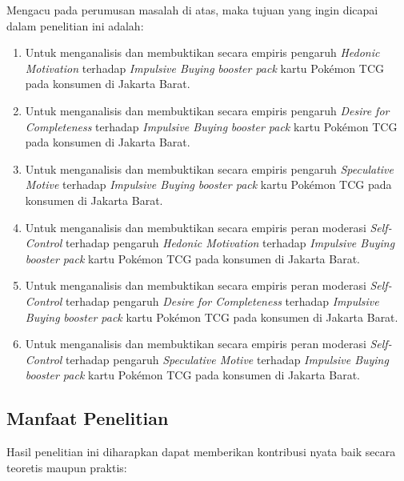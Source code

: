 \documentclass[12pt,a4paper]{article}
\numberwithin{equation}{section}
\numberwithin{table}{section}
\numberwithin{figure}{section}
\begin{document}
Mengacu pada perumusan masalah di atas, maka tujuan yang ingin dicapai dalam penelitian ini adalah:
\begin{enumerate}
  \item Untuk menganalisis dan membuktikan secara empiris pengaruh \emph{Hedonic Motivation} terhadap \emph{Impulsive Buying} \emph{booster pack} kartu Pok\'emon TCG pada konsumen di Jakarta Barat.
  \item Untuk menganalisis dan membuktikan secara empiris pengaruh \emph{Desire for Completeness} terhadap \emph{Impulsive Buying} \emph{booster pack} kartu Pok\'emon TCG pada konsumen di Jakarta Barat.
  \item Untuk menganalisis dan membuktikan secara empiris pengaruh \emph{Speculative Motive} terhadap \emph{Impulsive Buying} \emph{booster pack} kartu Pok\'emon TCG pada konsumen di Jakarta Barat.
  \item Untuk menganalisis dan membuktikan secara empiris peran moderasi \emph{Self-Control} terhadap pengaruh \emph{Hedonic Motivation} terhadap \emph{Impulsive Buying} \emph{booster pack} kartu Pok\'emon TCG pada konsumen di Jakarta Barat.
  \item Untuk menganalisis dan membuktikan secara empiris peran moderasi \emph{Self-Control} terhadap pengaruh \emph{Desire for Completeness} terhadap \emph{Impulsive Buying} \emph{booster pack} kartu Pok\'emon TCG pada konsumen di Jakarta Barat.
  \item Untuk menganalisis dan membuktikan secara empiris peran moderasi \emph{Self-Control} terhadap pengaruh \emph{Speculative Motive} terhadap \emph{Impulsive Buying} \emph{booster pack} kartu Pok\'emon TCG pada konsumen di Jakarta Barat.
\end{enumerate}

\subsection{Manfaat Penelitian}

Hasil penelitian ini diharapkan dapat memberikan kontribusi nyata baik secara teoretis maupun praktis:
\end{document}

